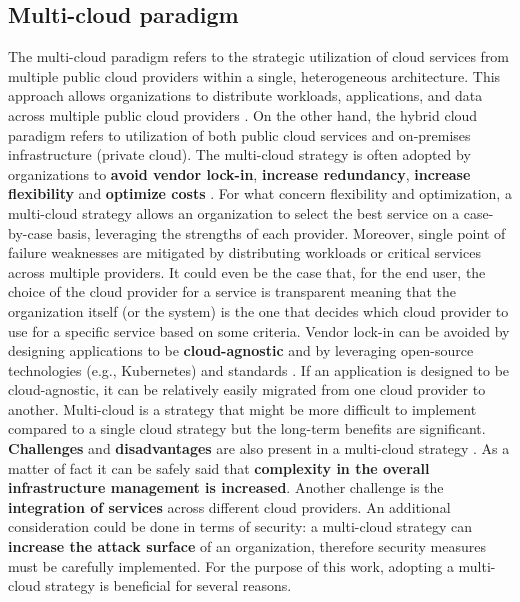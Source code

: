 \subsection{Multi-cloud paradigm}

The multi-cloud paradigm refers to the strategic utilization of cloud services from multiple public cloud providers within a single, heterogeneous architecture. 
This approach allows organizations to distribute workloads, applications, and data across multiple public cloud providers \cite{google_multicloud}.
On the other hand, the hybrid cloud paradigm refers to utilization of both public cloud services and on-premises infrastructure (private cloud).
The multi-cloud strategy is often adopted by organizations to \textbf{avoid vendor lock-in}, \textbf{increase redundancy}, \textbf{increase flexibility} and \textbf{optimize costs} \cite{google_multicloud}.
For what concern flexibility and optimization, a multi-cloud strategy allows an organization to select the best service on a case-by-case basis, leveraging the strengths of each provider.
Moreover, single point of failure weaknesses are mitigated by distributing workloads or critical services across multiple providers.
It could even be the case that, for the end user, the choice of the cloud provider for a service is transparent meaning that the organization itself (or the system) is the one that decides which cloud provider to use for a specific service based on some criteria.
Vendor lock-in can be avoided by designing applications to be \textbf{cloud-agnostic} and by leveraging open-source technologies (e.g., Kubernetes) and standards \cite{google_multicloud}.
If an application is designed to be cloud-agnostic, it can be relatively easily migrated from one cloud provider to another.
Multi-cloud is a strategy that might be more difficult to implement compared to a single cloud strategy but the long-term benefits are significant.
\textbf{Challenges} and \textbf{disadvantages} are also present in a multi-cloud strategy \cite{google_multicloud}.
As a matter of fact it can be safely said that \textbf{complexity in the overall infrastructure management is increased}.
Another challenge is the \textbf{integration of services} across different cloud providers.
An additional consideration could be done in terms of security: a multi-cloud strategy can \textbf{increase the attack surface} of an organization, therefore security measures must be carefully implemented.
\newline
For the purpose of this work, adopting a multi-cloud strategy is beneficial for several reasons.
